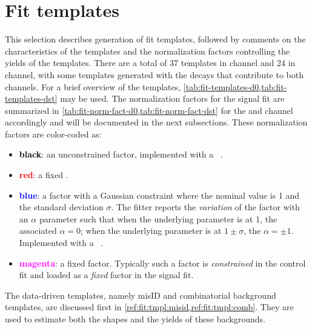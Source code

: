 \section{Fit templates}
\label{ref:fit:tmpl}

This selection describes generation of fit templates,
followed by comments on the characteristics of the templates and the
normalization factors controlling the yields of the templates.
There are a total of 37 templates in \Dz channel and 24 in \Dstar channel,
with some templates generated with the decays that contribute to both
channels.
For a brief overview of the templates,
\cref{tab:fit-templates-d0,tab:fit-templates-dst} may be used.
The normalization factors for the signal fit are summarized in
\cref{tab:fit-norm-fact-d0,tab:fit-norm-fact-dst} for the \Dz and \Dstar channel
accordingly and will be documented in the next subsections.
These normalization factors are color-coded as:
\begin{itemize}
    \item \textbf{\textcolor{black}{black}}:
        an unconstrained factor,
        implemented with a \HistFactory\ .
    \item \textbf{\textcolor{red}{red}}:
        a fixed .
    \item \textbf{\textcolor{blue}{blue}}:
        a factor with a Gaussian constraint
        where the nominal value is 1 and the standard deviation $\sigma$.
        The fitter reports the \emph{variation} of the factor with an $\alpha$
        parameter such that when the underlying parameter is at 1,
        the associated $\alpha = 0$;
        when the underlying parameter is at $1 \pm \sigma$, the $\alpha = \pm 1$.
        Implemented with a \HistFactory\ .
    \item \textbf{\textcolor{magenta}{magenta}}:
        a fixed  factor.
        Typically such a factor is \emph{constrained} in the control fit and
        loaded as a \emph{fixed} factor in the signal fit.
\end{itemize}

The data-driven templates,
namely \muon misID and combinatorial background templates,
are discussed first in \cref{ref:fit:tmpl:misid,ref:fit:tmpl:comb}.
They are used to estimate both the shapes and the yields of these backgrounds.

